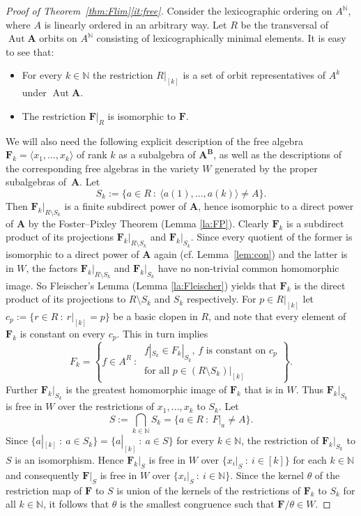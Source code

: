 \documentclass[12pt,a4paper,reqno]{amsart}
\numberwithin{equation}{section}
\theoremstyle{plain}
\theoremstyle{definition}
\newcommand{\A}{\mathbf{A}}
\newcommand{\B}{\mathbf{B}}
\newcommand{\F}{\mathbf{F}}
\newcommand{\N}{\mathbb{N}}
\DeclareMathOperator{\Aut}{Aut}
\newcommand{\st}{\: :\:}
\begin{document}
\begin{proof}[Proof of Theorem~\ref{thm:Flim}\eqref{it:free}]
Consider the lexicographic ordering on $A^\N$, where $A$ is linearly ordered in an arbitrary way.
Let $R$ be the transversal of $\Aut\A$ orbits on $A^\N$ consisting of lexicographically minimal elements.
It is easy to see that:
\begin{itemize}
\item
For every $k\in\N$ the restriction $R|_{[k]}$
 is a set of orbit representatives of $A^k$ under $\Aut\A$.
\item
The restriction $\F|_R$ is isomorphic to $\F$.
\end{itemize}
 We will also need the following explicit description of the free algebra 
 $\F_k=\langle x_1,\dots,x_k\rangle$ of rank $k$ as a subalgebra of $\A^\B$, as well as the descriptions of the corresponding free algebras in the variety $W$ generated by the proper subalgebras of~$\A$. Let
\[ S_k := \{ a\in R \st \langle a(1),\dots,a(k)\rangle \neq A \}. \]
 Then $\F_k|_{R\setminus S_k}$ is a finite subdirect power of $\A$, hence isomorphic to a direct power of $\A$
 by the Foster--Pixley Theorem 
 (Lemma \ref{la:FP}). Clearly $\F_k$ is a subdirect product of
 its projections $\F_k|_{R\setminus S_k}$ and $\F_k|_{S_k}$. Since every quotient of the former is isomorphic to a direct power
 of $\A$ again (cf. Lemma~\ref{lem:con}) and the latter is in $W$,
 the factors $\F_k|_{R\setminus S_k}$ and $\F_k|_{S_k}$ have no non-trivial common homomorphic image.
 So Fleischer's Lemma (Lemma \ref{la:Fleischer})
 yields that $\F_k$ is the direct product of its projections to $R\setminus S_k$ and $S_k$ respectively.
 For $p \in R|_{[k]}$ let $c_p := \{ r\in R \st r|_{[k]} = p \}$ be a basic clopen in $R$, and
 note that every element of $\F_k$ is constant on every $c_p$.
 This in turn implies
\begin{equation} \label{eq:Fk}
  F_k = \left\{ f\in A^R \st \begin{array}{l}
                           f|_{S_k}\in F_k|_{S_k},\, f \text{ is constant on } c_p \\ \text{for all } p \in (R\setminus S_k)|_{[k]}
                           \end{array} \right\}.
\end{equation}
Further $\F_k|_{S_k}$ is the greatest homomorphic image of $\F_k$ that is in $W$.
  Thus $\F_k|_{S_k}$ is free in $W$ over the restrictions of $x_1,\dots,x_k$ to $S_k$.                  
Let
\[ S := \bigcap_{k\in\N} S_k = \{ a\in R \st F|_a \neq A \}. \] 
 Since $\{ a|_{[k]} \st a\in S_k \} = \{ a|_{[k]} \st a\in S \}$ for every $k\in\N$,
  the restriction of $\F_k|_{S_k}$ to $S$ is an isomorphism.
 Hence $\F_k|_S$ is free in $W$ over $\{ x_i|_S \st i\in [k]\}$ for each $k\in\N$
 and consequently $\F|_S$ is free in $W$ over $\{ x_i|_S \st i\in \N\}$.
 Since the kernel $\theta$ of the restriction map of $\F$ to $S$ is union of the kernels of the restrictions of $\F_k$
 to $S_k$ for all $k\in\N$, it follows that $\theta$ is the smallest congruence such that $\F/\theta\in W$.


\end{proof}
\end{document}
